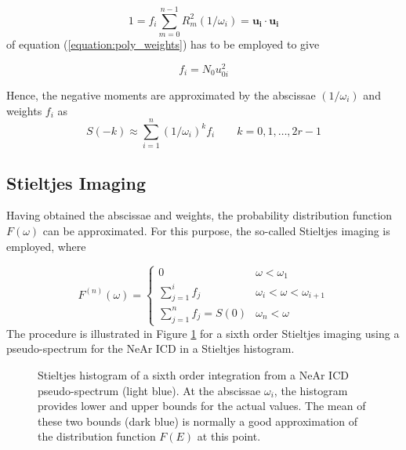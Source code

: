 \begin{equation}
  1 = f_i \sum\limits_{m=0}^{n-1} R_m^2 (1/\omega_i) = \mathbf{u_i} \cdot \mathbf{u_i}
\end{equation}
of equation (\ref{equation:poly_weights}) has to be employed to give

\begin{equation}
  f_i = N_0 u_{0i}^2 
\end{equation}

Hence, the negative moments are approximated by the abscissae $(1/\omega_i)$ and
weights $f_i$ as
\begin{equation}
  S(-k) \approx \sum\limits_{i=1}^n (1/\omega_i)^k  f_i \quad\quad k=0,1,\dots,2r-1 
\end{equation}





\subsection{Stieltjes Imaging}
Having obtained the abscissae and weights, the probability distribution function
$F(\omega)$ can be approximated. For this purpose, the so-called Stieltjes imaging
is employed, where

\begin{equation}
  F^{(n)} (\omega) =
  \begin{cases}
    0                                & \omega < \omega_1\\
    \sum\limits_{j=1}^{i} f_j        & \omega_i < \omega < \omega_{i+1}\\
    \sum\limits_{j=1}^{n} f_j = S(0) & \omega_n < \omega 
  \end{cases}
\end{equation}
The procedure is illustrated in Figure \ref{figure:stieltjes_imaging} for a sixth
order Stieltjes imaging using a pseudo-spectrum for the NeAr ICD in a
Stieltjes histogram.


\begin{figure}[h]
  \centering
  
  \caption{Stieltjes histogram of a sixth order integration from
           a NeAr ICD pseudo-spectrum (light blue). At the abscissae $\omega_i$,
           the histogram provides lower and upper bounds for the actual
           values. The mean of these two bounds (dark blue) is normally a good
           approximation of the distribution function $F(E)$ at this point.}
  \label{figure:stieltjes_imaging}
\end{figure}


